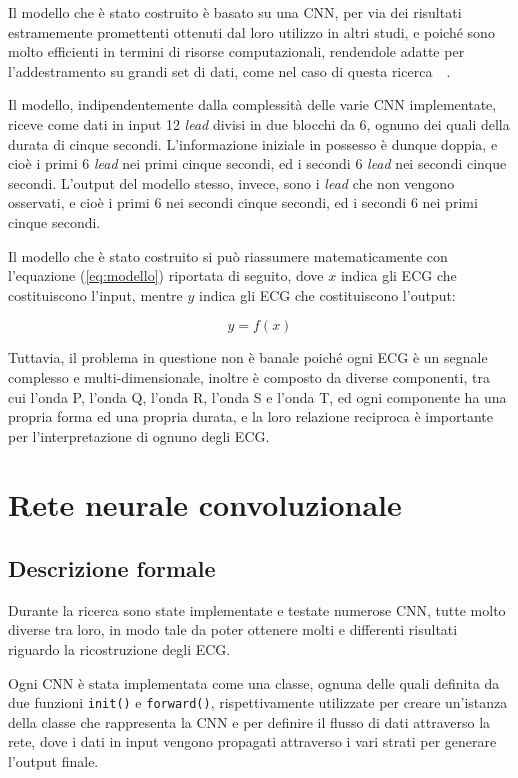 \documentclass[12pt,italian]{report}
\begin{document}
	Il modello che è stato costruito è basato su una CNN, per via dei risultati estramemente promettenti ottenuti dal loro utilizzo in altri studi, e poiché sono molto efficienti in termini di risorse computazionali, rendendole adatte per l'addestramento su grandi set di dati, come nel caso di questa ricerca~\cite{ribeiro}~\cite{hannun}.
	
	Il modello, indipendentemente dalla complessità delle varie CNN implementate, riceve come dati in input 12 \textit{lead} divisi in due blocchi da 6, ognuno dei quali della durata di cinque secondi. L'informazione iniziale in possesso è dunque doppia, e cioè i primi 6 \textit{lead} nei primi cinque secondi, ed i secondi 6 \textit{lead} nei secondi cinque secondi. L'output del modello stesso, invece, sono i \textit{lead} che non vengono osservati, e cioè i primi 6 nei secondi cinque secondi, ed i secondi 6 nei primi cinque secondi.
	
	Il modello che è stato costruito si può riassumere matematicamente con l'equazione (\ref{eq:modello}) riportata di seguito, dove $ x $ indica gli ECG che costituiscono l'input, mentre $ y $ indica gli ECG che costituiscono l'output:
	
	\begin{equation}
		y = f(x)
		\label{eq:modello}
	\end{equation}
	
	Tuttavia, il problema in questione non è banale poiché ogni ECG è un segnale complesso e multi-dimensionale, inoltre è composto da diverse componenti, tra cui l'onda P, l'onda Q, l'onda R, l'onda S e l'onda T, ed ogni componente ha una propria forma ed una propria durata, e la loro relazione reciproca è importante per l'interpretazione di ognuno degli ECG.
	
	
	\section{Rete neurale convoluzionale}
	\label{sec:network}
	
	
	\subsection{Descrizione formale}
	\label{subsec:descrizione}
	
	Durante la ricerca sono state implementate e testate numerose CNN, tutte molto diverse tra loro, in modo tale da poter ottenere molti e differenti risultati riguardo la ricostruzione degli ECG.
	
	Ogni CNN è stata implementata come una classe, ognuna delle quali definita da due funzioni \texttt{init()} e \texttt{forward()}, rispettivamente utilizzate per creare un'istanza della classe che rappresenta la CNN e per definire il flusso di dati attraverso la rete, dove i dati in input vengono propagati attraverso i vari strati per generare l'output finale.
	
\end{document}
